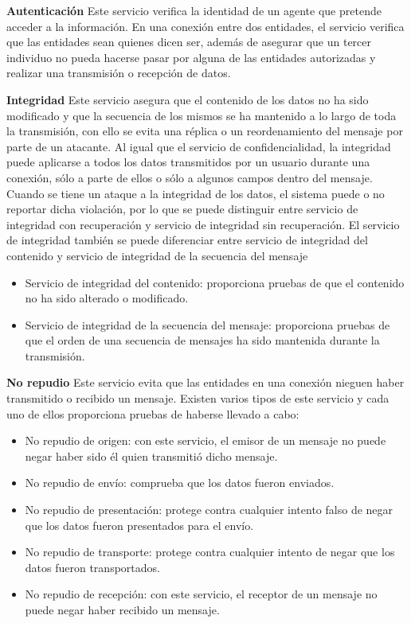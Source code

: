 \textbf{Autenticación}
Este servicio verifica la identidad de un agente que pretende acceder a la información. En una conexión entre dos entidades, el servicio verifica que las entidades sean quienes dicen ser, además de asegurar que un tercer individuo no pueda hacerse pasar por alguna de las entidades autorizadas y realizar una transmisión o recepción de datos.

\textbf{Integridad}
Este servicio asegura que el contenido de los datos no ha sido modificado y que la secuencia de los mismos se ha mantenido a lo largo de toda la transmisión, con ello se evita una réplica o un reordenamiento del mensaje por parte de un atacante.
Al igual que el servicio de confidencialidad, la integridad puede aplicarse a todos los datos transmitidos por un usuario durante una conexión, sólo a parte de ellos o sólo a algunos campos dentro del mensaje.
Cuando se tiene un ataque a la integridad de los datos, el sistema puede o no reportar dicha violación, por lo que se puede distinguir entre servicio de integridad con recuperación y servicio de integridad sin recuperación.
El servicio de integridad también se puede diferenciar entre servicio de integridad del contenido y servicio de integridad de la secuencia del mensaje
\begin{itemize}
	\item Servicio de integridad del contenido: proporciona pruebas de que el contenido no ha sido alterado o modificado.
	\item Servicio de integridad de la secuencia del mensaje: proporciona pruebas de que el orden de una secuencia de mensajes ha sido mantenida durante la transmisión.
\end{itemize}

\textbf{No repudio}
Este servicio evita que las entidades en una conexión nieguen haber transmitido o recibido un mensaje.
Existen varios tipos de este servicio y cada uno de ellos proporciona pruebas de haberse llevado a cabo:
\begin{itemize}
	\item No repudio de origen: con este servicio, el emisor de un mensaje no puede negar haber sido él quien transmitió dicho mensaje.
	\item No repudio de envío: comprueba que los datos fueron enviados.
	\item No repudio de presentación: protege contra cualquier intento falso de negar que los datos fueron presentados para el envío.
	\item No repudio de transporte: protege contra cualquier intento de negar que los datos fueron transportados.
	\item No repudio de recepción: con este servicio, el receptor de un mensaje no puede negar haber recibido un mensaje.
\end{itemize}


